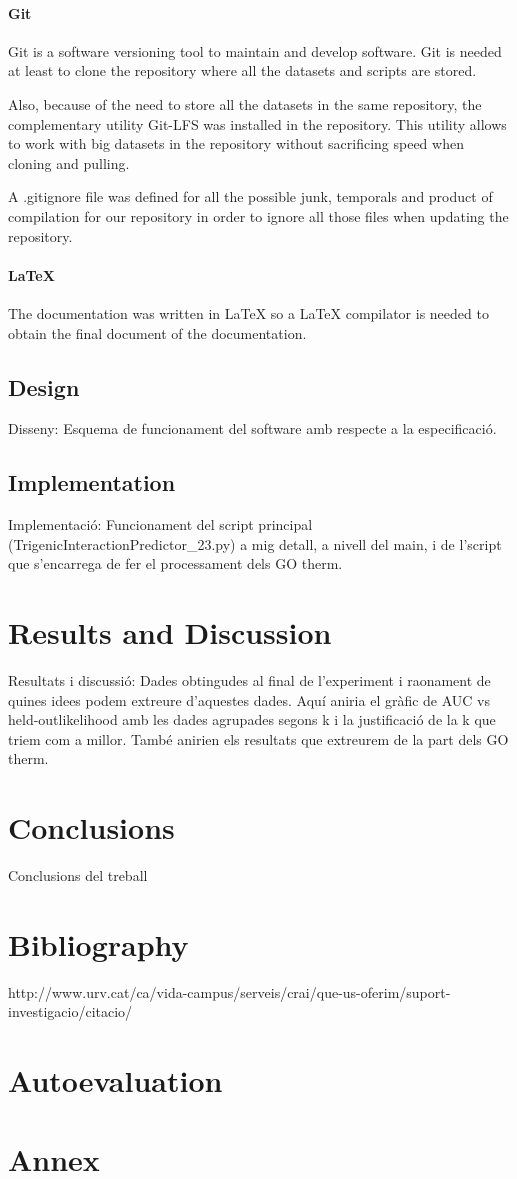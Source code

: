 \documentclass[11pt]{article}
\begin{document}
      \paragraph{Git}
      Git is a software versioning tool to maintain and develop software. Git is needed at least to clone the repository where all the datasets and scripts are stored. 
      \par
      Also, because of the need to store all the datasets in the same repository, the complementary utility Git-LFS was installed in the repository. This utility allows to work with big datasets in the repository without sacrificing speed when cloning and pulling.
      \par 
      A .gitignore file was defined for all the possible junk, temporals and product of compilation for our repository in order to ignore all those files when updating the repository.
      \paragraph{LaTeX}
      The documentation was written in LaTeX so a LaTeX compilator is needed to obtain the final document of the documentation.

  \subsection{Design}
  Disseny: Esquema de funcionament del software amb respecte a la especificació.

  \subsection{Implementation}
  Implementació: Funcionament del script principal (TrigenicInteractionPredictor\_23.py) a mig detall, a nivell del main, i de l'script que s'encarrega de fer el processament dels GO therm.

\section{Results and Discussion}
Resultats i discussió: Dades obtingudes al final de l'experiment i raonament de quines idees podem extreure d'aquestes dades. Aquí aniria el gràfic de AUC vs held-outlikelihood amb les dades agrupades segons k i la justificació de la k que triem com a millor. També anirien els resultats que extreurem de la part dels GO therm.

\section{Conclusions}
Conclusions del treball

\section{Bibliography}
http://www.urv.cat/ca/vida-campus/serveis/crai/que-us-oferim/suport-investigacio/citacio/

\section{Autoevaluation}

\section{Annex}
\end{document}
